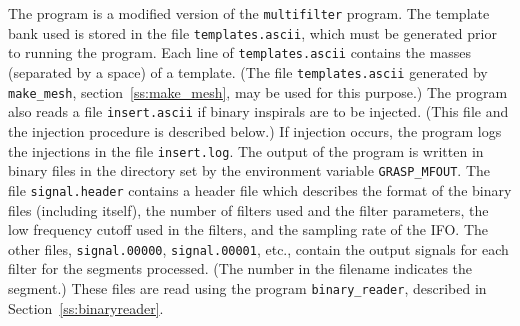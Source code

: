 The program is a modified version of the \texttt{multifilter} program.
The template bank used is stored in the file \texttt{templates.ascii},
which must be generated prior to running the program.  Each line of
\texttt{templates.ascii} contains the masses (separated by a space)
of a template.  (The file \texttt{templates.ascii} generated by
\texttt{make\_mesh}, section~\ref{ss:make_mesh}, may be used for
this purpose.)  The program also reads a file \texttt{insert.ascii}
if binary inspirals are to be injected.  (This file and the injection
procedure is described below.)  If injection occurs, the program logs the
injections in the file \texttt{insert.log}.  The output of the program
is written in binary files in the directory set by the environment
variable \texttt{GRASP\_MFOUT}.  The file \texttt{signal.header} contains
a header file which describes the format of the binary files (including
itself), the number of filters used and the filter parameters, the low
frequency cutoff used in the filters, and the sampling rate of the IFO.
The other files, \texttt{signal.00000}, \texttt{signal.00001}, etc.,
contain the output signals for each filter for the segments processed.
(The number in the filename indicates the segment.)  These files
are read using the program \texttt{binary\_reader}, described in
Section~\ref{ss:binaryreader}.

